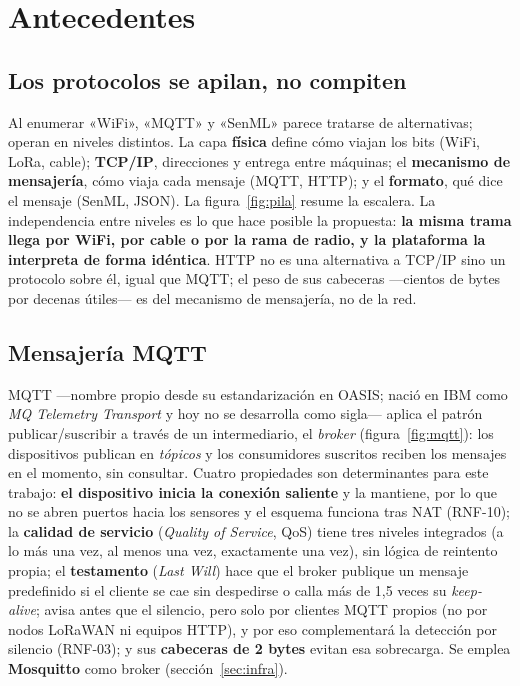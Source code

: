 \chapter[Antecedentes]{Antecedentes}
\label{cap:antecedentes}

\section{Los protocolos se apilan, no compiten}

Al enumerar «WiFi», «MQTT» y «SenML» parece tratarse de alternativas; operan en niveles distintos.
La capa \textbf{física} define cómo viajan los bits (WiFi, LoRa, cable); \textbf{TCP/IP}, direcciones
y entrega entre máquinas; el \textbf{mecanismo de mensajería}, cómo viaja cada mensaje (MQTT, HTTP);
y el \textbf{formato}, qué dice el mensaje (SenML, JSON). La figura~\ref{fig:pila} resume la escalera.
La independencia entre niveles es lo que hace posible la propuesta: \textbf{la misma trama llega por
WiFi, por cable o por la rama de radio, y la plataforma la interpreta de forma idéntica}. HTTP no es
una alternativa a TCP/IP sino un protocolo sobre él, igual que MQTT; el peso de sus cabeceras —cientos de bytes por decenas útiles— es del mecanismo de mensajería, no de la red.



\section{Mensajería MQTT}

MQTT \parencite{mqttoasis} —nombre propio desde su estandarización en OASIS; nació en IBM como
\emph{MQ Telemetry Transport} y hoy no se desarrolla como sigla— aplica el patrón publicar/suscribir
a través de un intermediario, el \emph{broker} (figura~\ref{fig:mqtt}): los dispositivos publican en \emph{tópicos} y
los consumidores suscritos reciben los mensajes en el momento, sin consultar. Cuatro propiedades son
determinantes para este trabajo: \textbf{el dispositivo inicia la conexión saliente} y la mantiene, por
lo que no se abren puertos hacia los sensores y el esquema funciona tras NAT (RNF-10); la
\textbf{calidad de servicio} (\emph{Quality of Service}, QoS) tiene tres niveles integrados (a lo más
una vez, al menos una vez, exactamente una vez), sin lógica de reintento propia; el \textbf{testamento} (\emph{Last Will}) hace
que el broker publique un mensaje predefinido si el cliente se cae sin despedirse o calla más de 1,5 veces su \emph{keep-alive}; avisa antes que el silencio, pero solo por clientes MQTT propios (no por nodos LoRaWAN ni equipos HTTP), y por eso complementará la detección por silencio (RNF-03); y sus \textbf{cabeceras de 2 bytes} evitan esa sobrecarga. Se emplea \textbf{Mosquitto} como broker (sección~\ref{sec:infra}).

